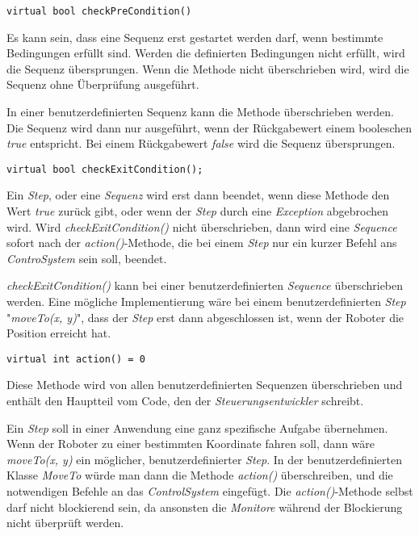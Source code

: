 \begin{lstlisting}
virtual bool checkPreCondition()
\end{lstlisting}
Es kann sein, dass eine Sequenz erst gestartet werden darf, wenn bestimmte Bedingungen erfüllt sind.
Werden die definierten Bedingungen nicht erfüllt, wird die Sequenz übersprungen.
Wenn die Methode nicht überschrieben wird, wird die Sequenz ohne Überprüfung ausgeführt.

In einer benutzerdefinierten Sequenz kann die Methode überschrieben werden.
Die Sequenz wird dann nur ausgeführt, wenn der Rückgabewert einem booleschen \textit{true} entspricht.
Bei einem Rückgabewert \textit{false} wird die Sequenz übersprungen.


\begin{lstlisting}
virtual bool checkExitCondition();
\end{lstlisting}
Ein \textit{Step}, oder eine \textit{Sequenz} wird erst dann beendet, wenn diese Methode den Wert \textit{true} zurück gibt, oder wenn der \textit{Step} durch eine \textit{Exception} abgebrochen wird.
Wird \textit{checkExitCondition()} nicht überschrieben, dann wird eine \textit{Sequence} sofort nach der \textit{action()}-Methode, die bei einem \textit{Step} nur ein kurzer Befehl ans \textit{ControSystem} sein soll, beendet.

\textit{checkExitCondition()} kann bei einer benutzerdefinierten \textit{Sequence} überschrieben werden.
Eine mögliche Implementierung wäre bei einem benutzerdefinierten \textit{Step} "\textit{moveTo(x, y)}", dass der \textit{Step} erst dann abgeschlossen ist, wenn der Roboter die Position erreicht hat.



\begin{lstlisting}
virtual int action() = 0
\end{lstlisting}
Diese Methode wird von allen benutzerdefinierten Sequenzen überschrieben und enthält den Hauptteil vom Code, den der \textit{Steuerungsentwickler} schreibt.

Ein \textit{Step} soll in einer Anwendung eine ganz spezifische Aufgabe übernehmen.
Wenn der Roboter zu einer bestimmten Koordinate fahren soll, dann wäre \textit{moveTo(x, y)} ein möglicher, benutzerdefinierter \textit{Step}.
In der benutzerdefinierten Klasse \textit{MoveTo} würde man dann die Methode \textit{action()} überschreiben, und die notwendigen Befehle an das \textit{ControlSystem} eingefügt.
Die \textit{action()}-Methode selbst darf nicht blockierend sein, da ansonsten die \textit{Monitore} während der Blockierung nicht überprüft werden.

